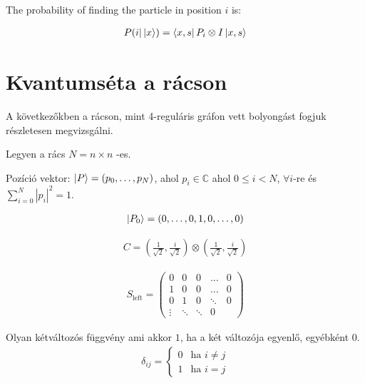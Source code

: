 The probability of finding the particle in position $i$ is:

\begin{align}
    P(i | \ket{x}) = \bra{x,s}P_i\otimes{}I\ket{x,s}
\end{align}

\section{Kvantumséta a rácson}

A következőkben a rácson, mint 4-reguláris gráfon vett bolyongást fogjuk
részletesen megvizsgálni.

Legyen a rács $N = n \times n$ -es.

Pozíció vektor: $\ket{P} =  (p_{0}, \dots, p_{N})$, ahol
$p_{i}\in\mathds{C}$ ahol $0 \leq{} i < N$, $\forall{}i$-re és $\sum\limits_{i=0}^{N} |p_i|^2 = 1$.

\begin{align}
  \ket{P_{0}} =  (0, \dots, 0, 1, 0, \dots, 0)
\end{align}

\begin{align}
  C = (\frac{1}{\sqrt{2}}, \frac{i}{\sqrt{2}}) \otimes (\frac{1}{\sqrt{2}}, \frac{i}{\sqrt{2}})
\end{align}

\begin{align}
  S_{\text{left}} =
  \begin{pmatrix}
    0      & 0      & 0      & \dots  & 0 \\
    1      & 0      & 0      & \dots  & 0 \\
    0      & 1      & 0      & \ddots & 0 \\
    \vdots & \ddots & \ddots & 0
  \end{pmatrix}
\end{align}

\begin{definition}
  Olyan kétváltozós függvény ami akkor $1$, ha a két változója egyenlő, egyébként $0$.
  \begin{align}
    \delta_{ij} =
    \begin{cases}
      0 & \text{ha $i\neq{}j$} \\
      1 & \text{ha $i=j$}
    \end{cases}
  \end{align}
\end{definition}

